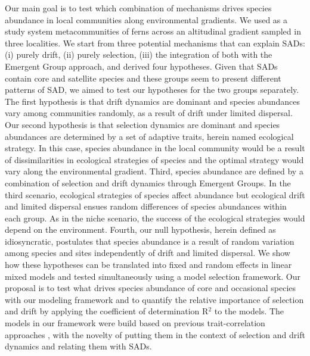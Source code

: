 \documentclass[12pt]{article}
\begin{document}
Our main goal is to test which combination of mechanisms drives species abundance in local communities along environmental gradients. We used as a study system metacommunities of ferns across an altitudinal gradient sampled in three localities. 
We start from three potential mechanisms that can explain SADs: (i) purely drift,  (ii) purely selection, (iii) the integration of both with the Emergent Group approach, and derived four hypotheses. Given that SADs contain core and satellite species and these groups seem to present different patterns of SAD, we aimed to test our hypotheses for the two groups separately. 
The first hypothesis is that drift dynamics are dominant and species abundances vary among communities randomly, as a result of drift under limited dispersal.
Our second hypothesis is that selection dynamics are dominant and species abundances are determined by a set of adaptive traits, herein named ecological strategy. 
In this case, species abundance in the local community would be a result of dissimilarities in ecological strategies of species and the optimal strategy would vary along the environmental gradient. 
Third, species abundance are defined by a combination of selection and drift dynamics through Emergent Groups. In the third scenario, ecological strategies of species affect abundance but ecological drift and limited dispersal ensues random differences of species abundances within each group. As in the niche scenario, the success of the ecological strategies would depend on the environment.
Fourth, our null hypothesis, herein defined as idiosyncratic, postulates that species abundance is a result of random variation among species and sites independently of drift and limited dispersal.
We show how these hypotheses can be translated into fixed and random effects in linear mixed models and tested simultaneously using a model selection framework.
Our proposal is to test what drives species abundance of core and occasional species with our modeling framework and to quantify the relative importance of selection and drift by applying the coefficient of determination R{$^2$} \citep{Nakagawa2013, Nakagawa2017} to the models. The models in our framework were build based on previous trait-correlation approaches \citep{Pollock2012, Jamil2013, Jamil2013a, Miller2019, TerBraak2019}, with the novelty of putting them in the context of selection and drift dynamics and relating them with SADs. 
\end{document}
